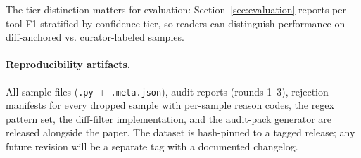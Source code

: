 The tier distinction matters for evaluation:
Section~\ref{sec:evaluation} reports per-tool F1 stratified by
confidence tier, so readers can distinguish performance on
diff-anchored vs. curator-labeled samples.

\paragraph{Reproducibility artifacts.}
All sample files (\texttt{.py}~+~\texttt{.meta.json}), audit
reports (rounds 1--3), rejection manifests for every dropped
sample with per-sample reason codes, the regex pattern set,
the diff-filter implementation, and the audit-pack generator
are released alongside the paper. The dataset is hash-pinned
to a tagged release; any future revision will be a separate
tag with a documented changelog.
